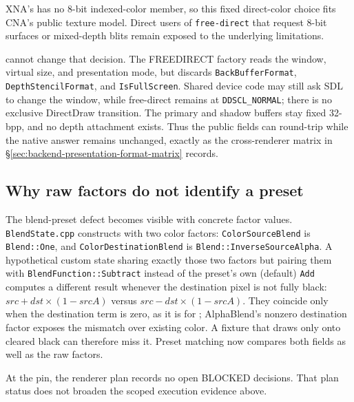 XNA's  has no 8-bit indexed-color member, so this fixed direct-color
choice fits CNA's public texture model. Direct users of \texttt{free-direct} that request 8-bit
surfaces or mixed-depth blits remain exposed to the underlying limitations.

\begin{sourcenote}
 cannot change that decision. The FREEDIRECT factory reads the
window, virtual size, and presentation mode, but discards
\texttt{BackBuffer\allowbreak Format}, \texttt{DepthStencil\allowbreak Format}, and
\texttt{IsFull\allowbreak Screen}. Shared device code may still ask SDL to change the window, while
free-direct remains at \texttt{DDSCL\_NORMAL}; there is no exclusive DirectDraw transition.
The primary and shadow buffers stay fixed 32-bpp, and no depth attachment exists. Thus the
public fields can round-trip while the native answer remains unchanged, exactly as the
cross-renderer matrix in \S\ref{sec:backend-presentation-format-matrix} records.
\end{sourcenote}

\subsection{Why raw factors do not identify a preset}

The blend-preset defect becomes visible with concrete factor values.
\texttt{BlendState.cpp} constructs  with two color factors:
\texttt{ColorSourceBlend} is \texttt{Blend::One}, and \texttt{ColorDestinationBlend} is
\texttt{Blend::InverseSourceAlpha}. A hypothetical custom state sharing exactly those two
factors but pairing them with
\texttt{BlendFunction::Subtract} instead of the preset's own (default) \texttt{Add} computes a
different result whenever the destination pixel is not fully black:
$\mathit{src} + \mathit{dst} \times (1 - \mathit{srcA})$ versus
$\mathit{src} - \mathit{dst} \times (1 - \mathit{srcA})$. They coincide only when the
destination term is zero, as it is for ; AlphaBlend's nonzero
destination factor exposes the mismatch over existing color. A fixture that draws only onto
cleared black can therefore miss it. Preset matching now compares both
 fields as well as the raw factors.

At the pin, the renderer plan records no open BLOCKED decisions. That plan status does not
broaden the scoped execution evidence above.

